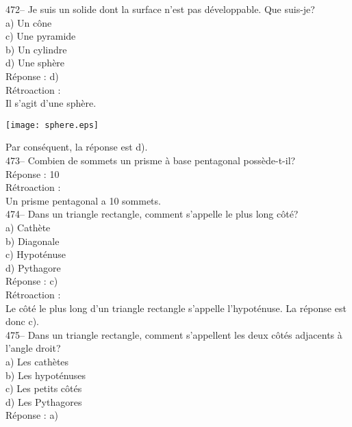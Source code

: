 ﻿\documentclass[letterpaper, 12pt]{article}
\begin{document}
472-- Je suis un solide dont la surface n'est pas d\'eveloppable.  Que
suis-je?\\
a) Un c\^one\\
c) Une pyramide\\
b) Un cylindre\\
d) Une sph\`ere\\

R\'eponse : d)\\

R\'etroaction : \\
Il s'agit d'une sph\`ere.
    \begin{center}
    \texttt{[image: sphere.eps]}
    \end{center}

Par cons\'equent, la r\'eponse est d).\\

473-- Combien de sommets un prisme \`a base pentagonal poss\`ede-t-il?\\

R\'eponse : 10\\

R\'etroaction : \\
Un prisme pentagonal a 10 sommets. \\


474-- Dans un triangle rectangle, comment s'appelle le plus long c\^ot\'e?\\
a) Cath\`ete\\
b) Diagonale\\
c) Hypot\'enuse\\
d) Pythagore\\

R\'eponse :  c)\\

R\'etroaction : \\
Le c\^ot\'e le plus long d'un triangle rectangle s'appelle l'hypot\'enuse.
La r\'eponse est donc c).\\


475-- Dans un triangle rectangle, comment s'appellent les deux c\^ot\'es
adjacents \`a l'angle droit?\\
a) Les cath\`etes\\
b) Les hypot\'enuses\\
c) Les petits c\^ot\'es\\
d) Les Pythagores\\

R\'eponse :  a)\\
\end{document}
